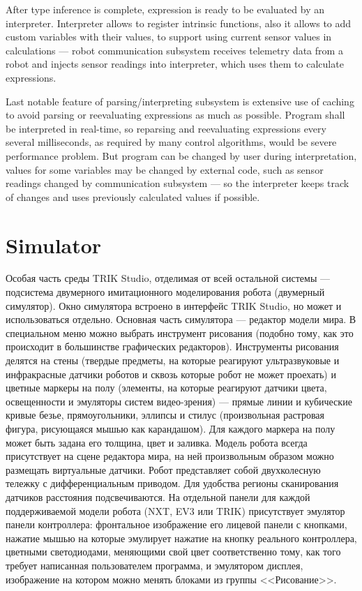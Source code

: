 \documentclass[conference]{IEEEtran}
\begin{document}
After type inference is complete, expression is ready to be evaluated by an interpreter. Interpreter allows to register intrinsic functions, also it allows to add custom variables with their values, to support using current sensor values in calculations --- robot communication subsystem receives telemetry data from a robot and injects sensor readings into interpreter, which uses them to calculate expressions.

Last notable feature of parsing/interpreting subsystem is extensive use of caching to avoid parsing or reevaluating expressions as much as possible. Program shall be interpreted in real-time, so reparsing and reevaluating expressions every several milliseconds, as required by many control algorithms, would be severe performance problem. But program can be changed by user during interpretation, values for some variables may be changed by external code, such as sensor readings changed by communication subsystem --- so the interpreter keeps track of changes and uses previously calculated values if possible.

\section{Simulator}
\label{chapter:2dModel}

Особая часть среды TRIK Studio, отделимая от всей остальной системы --- подсистема двумерного имитационного моделирования робота (двумерный симулятор). Окно симулятора встроено в интерфейс TRIK Studio, но может и использоваться отдельно. Основная часть симулятора --- редактор модели мира. В специальном меню можно выбрать инструмент рисования (подобно тому, как это происходит в большинстве графических редакторов). Инструменты рисования делятся на стены (твердые предметы, на которые реагируют ультразвуковые и инфракрасные датчики роботов и сквозь которые робот не может проехать) и цветные маркеры на полу (элементы, на которые реагируют датчики цвета, освещенности и эмуляторы систем видео-зрения) --- прямые линии и кубические кривые безье, прямоугольники, эллипсы и стилус (произвольная растровая фигура, рисующаяся мышью как карандашом). Для каждого маркера на полу может быть задана его толщина, цвет и заливка. Модель робота всегда присутствует на сцене редактора мира, на ней произвольным образом можно размещать виртуальные датчики. Робот представляет собой двухколесную тележку с дифференциальным приводом. Для удобства регионы сканирования датчиков расстояния подсвечиваются. На отдельной панели для каждой поддерживаемой модели робота (NXT, EV3 или TRIK) присутствует эмулятор панели контроллера: фронтальное изображение его лицевой панели с кнопками, нажатие мышью на которые эмулирует нажатие на кнопку реального контроллера, цветными светодиодами, меняющими свой цвет соответственно тому, как того требует написанная пользователем программа, и эмулятором дисплея, изображение на котором можно менять блоками из группы <<Рисование>>.
\end{document}
